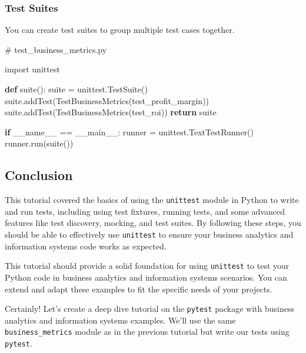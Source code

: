 \documentclass[
  letterpaper,
  DIV=11,
  numbers=noendperiod]{scrreprt}
\newenvironment{Shaded}{\begin{snugshade}}{\end{snugshade}}
\newcommand{\CommentTok}[1]{\textcolor[rgb]{0.37,0.37,0.37}{#1}}
\newcommand{\ControlFlowTok}[1]{\textcolor[rgb]{0.00,0.23,0.31}{\textbf{#1}}}
\newcommand{\ImportTok}[1]{\textcolor[rgb]{0.00,0.46,0.62}{#1}}
\newcommand{\KeywordTok}[1]{\textcolor[rgb]{0.00,0.23,0.31}{\textbf{#1}}}
\newcommand{\NormalTok}[1]{\textcolor[rgb]{0.00,0.23,0.31}{#1}}
\newcommand{\OperatorTok}[1]{\textcolor[rgb]{0.37,0.37,0.37}{#1}}
\newcommand{\StringTok}[1]{\textcolor[rgb]{0.13,0.47,0.30}{#1}}
\newcommand{\VariableTok}[1]{\textcolor[rgb]{0.07,0.07,0.07}{#1}}
\begin{document}
\subsubsection{Test Suites}\label{test-suites}

You can create test suites to group multiple test cases together.

\begin{Shaded}
\begin{Highlighting}[]
\CommentTok{\# test\_business\_metrics.py}

\ImportTok{import}\NormalTok{ unittest}

\KeywordTok{def}\NormalTok{ suite():}
\NormalTok{    suite }\OperatorTok{=}\NormalTok{ unittest.TestSuite()}
\NormalTok{    suite.addTest(TestBusinessMetrics(}\StringTok{\textquotesingle{}test\_profit\_margin\textquotesingle{}}\NormalTok{))}
\NormalTok{    suite.addTest(TestBusinessMetrics(}\StringTok{\textquotesingle{}test\_roi\textquotesingle{}}\NormalTok{))}
    \ControlFlowTok{return}\NormalTok{ suite}

\ControlFlowTok{if} \VariableTok{\_\_name\_\_} \OperatorTok{==} \StringTok{\textquotesingle{}\_\_main\_\_\textquotesingle{}}\NormalTok{:}
\NormalTok{    runner }\OperatorTok{=}\NormalTok{ unittest.TextTestRunner()}
\NormalTok{    runner.run(suite())}
\end{Highlighting}
\end{Shaded}

\subsection{Conclusion}\label{conclusion-23}

This tutorial covered the basics of using the \texttt{unittest} module
in Python to write and run tests, including using test fixtures, running
tests, and some advanced features like test discovery, mocking, and test
suites. By following these steps, you should be able to effectively use
\texttt{unittest} to ensure your business analytics and information
systems code works as expected.

This tutorial should provide a solid foundation for using
\texttt{unittest} to test your Python code in business analytics and
information systems scenarios. You can extend and adapt these examples
to fit the specific needs of your projects.

Certainly! Let's create a deep dive tutorial on the \texttt{pytest}
package with business analytics and information systems examples. We'll
use the same \texttt{business\_metrics} module as in the previous
tutorial but write our tests using \texttt{pytest}.
\end{document}

